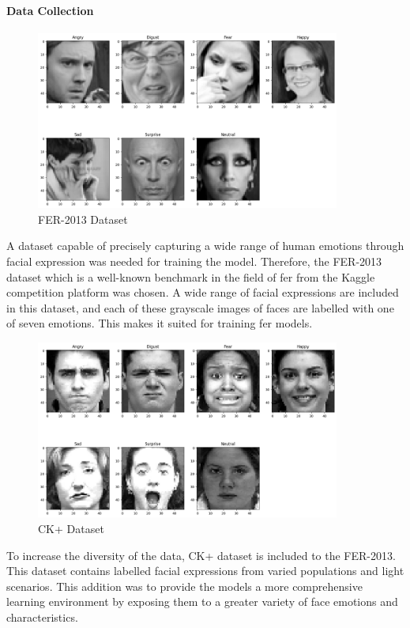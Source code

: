 \paragraph{Data Collection}
\begin{figure}[H]
    \centering
    \includegraphics[width=10cm]{Images/fer2013.png}
    \caption{FER-2013 Dataset}
    \label{fig:fer2013}
\end{figure}
A dataset capable of precisely capturing a wide range of human emotions through facial expression was needed for training the model. 
Therefore, the FER-2013 \citep{challenges_in_representation_learning_facial_expression_recognition_challenge} dataset which is a well-known benchmark in the field of  \gls{fer} from the Kaggle competition platform was chosen.
A wide range of facial expressions are included in this dataset, and each of these grayscale images of faces are labelled with one of seven emotions.
This makes it suited for training \gls{fer} models.
\begin{figure}[H]
    \centering
    \includegraphics[width=10cm]{Images/ckextended.png}
    \caption{CK+ Dataset}
    \label{fig:ckextended}
\end{figure}
\indent To increase the diversity of the data, CK+ \citep{5543262} dataset is included to the FER-2013. 
This dataset contains labelled facial expressions from varied populations and light scenarios.
This addition was to provide the models a more comprehensive learning environment by exposing them to a greater variety of face emotions and characteristics.

